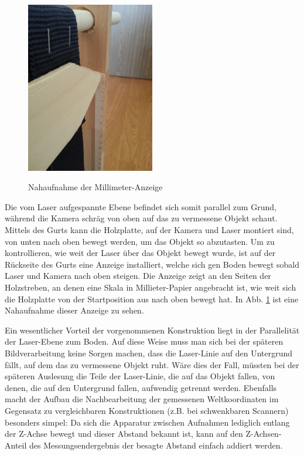 \begin{figure}
\centering \includegraphics[width=0.5\textwidth, angle = -90]{images/Scanner3.jpg}\label{fig:scanner3}
\caption{Nahaufnahme der Millimeter-Anzeige}
\end{figure}

Die vom Laser aufgespannte Ebene befindet sich somit parallel zum Grund, während die Kamera schräg von oben auf das zu vermessene Objekt schaut. Mittels des Gurts kann die Holzplatte, auf der Kamera und Laser montiert sind, von unten nach oben bewegt werden, um das Objekt so abzutasten. Um zu kontrollieren, wie weit der Laser über das Objekt bewegt wurde, ist auf der Rückseite des Gurts eine Anzeige installiert, welche sich gen Boden bewegt sobald Laser und Kamera nach oben steigen. Die Anzeige zeigt an den Seiten der Holzstreben, an denen eine Skala in Millieter-Papier angebracht ist, wie weit sich die Holzplatte von der Startposition aus nach oben bewegt hat. In Abb. \ref{fig:scanner3} ist eine Nahaufnahme dieser Anzeige zu sehen.

Ein wesentlicher Vorteil der vorgenommenen Konstruktion liegt in der Parallelität der Laser-Ebene zum Boden. Auf diese Weise muss man sich bei der späteren Bildverarbeitung keine Sorgen machen, dass die Laser-Linie auf den Untergrund fällt, auf dem das zu vermessene Objekt ruht. Wäre dies der Fall, müssten bei der späteren Auslesung die Teile der Laser-Linie, die auf das Objekt fallen, von denen, die auf den Untergrund fallen, aufwendig getrennt werden. Ebenfalls macht der Aufbau die Nachbearbeitung der gemessenen Weltkoordinaten im Gegensatz zu vergleichbaren Konstruktionen (z.B. bei schwenkbaren Scannern) besonders simpel: Da sich die Apparatur zwischen Aufnahmen lediglich entlang der Z-Achse bewegt und dieser Abstand bekannt ist, kann auf den Z-Achsen-Anteil des Messungsendergebnis der besagte Abstand einfach addiert werden.

